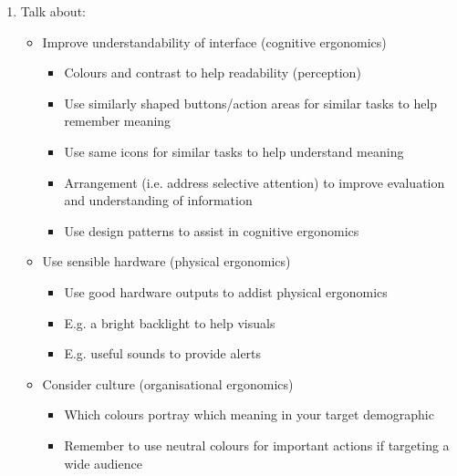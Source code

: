 \documentclass[11pt,a4paper]{report}
\begin{document}
\begin{enumerate}
    \item Talk about:
        \begin{itemize}
            \item Improve understandability of interface (cognitive ergonomics)
                \begin{itemize}
                    \item Colours and contrast to help readability (perception)
                    \item Use similarly shaped buttons/action areas for similar tasks to help remember meaning
                    \item Use same icons for similar tasks to help understand meaning
                    \item Arrangement (i.e. address selective attention) to improve evaluation and understanding of information
                    \item Use design patterns to assist in cognitive ergonomics
                \end{itemize}
            \item Use sensible hardware (physical ergonomics)
                \begin{itemize}
                    \item Use good hardware outputs to addist physical ergonomics
                    \item E.g. a bright backlight to help visuals
                    \item E.g. useful sounds to provide alerts
                \end{itemize}
            \item Consider culture (organisational ergonomics)
                \begin{itemize}
                    \item Which colours portray which meaning in your target demographic
                    \item Remember to use neutral colours for important actions if targeting a wide audience
                \end{itemize}   
        \end{itemize}


\end{enumerate}
\end{document}

